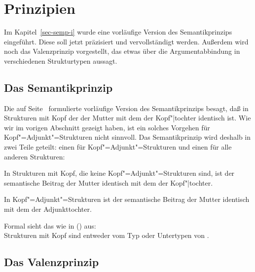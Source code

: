 \section{Prinzipien}
\label{sec-prinzipien}

Im Kapitel~\ref{sec-semp-i} wurde eine vorläufige Version des Semantikprinzips eingeführt. Diese
soll jetzt präzisiert und vervollständigt werden. Außerdem wird noch das Valenzprinzip vorgestellt, das etwas über
die Argumentabbindung in verschiedenen Strukturtypen aussagt.

\subsection{Das Semantikprinzip}

Die auf Seite~\pageref{semp-i} formulierte vorläufige Version des Semantikprinzips besagt,
daß in Strukturen mit Kopf der \contw der Mutter mit dem \contw der Kopf"|tochter
identisch ist. Wie wir im vorigen Abschnitt gezeigt haben, ist ein solches Vorgehen für
Kopf"=Adjunkt"=Strukturen nicht sinnvoll. Das Semantikprinzip wird deshalb in zwei Teile geteilt:
einen für Kopf"=Adjunkt"=Strukturen und einen für alle anderen Strukturen:
\begin{prinzip-break}[Semantikprinzip]
\label{semp}
In Strukturen mit Kopf, die keine Kopf"=Adjunkt"=Strukturen sind, ist der
semantische Beitrag der Mutter identisch mit dem der Kopf"|tochter.

In Kopf"=Adjunkt"=Strukturen ist der semantische Beitrag der Mutter
identisch mit dem der Adjunkttochter.
\end{prinzip-break}
Formal sieht das wie in () aus:
\ea
{} \impl
{}\\[2mm]

 \impl
{}
\z
Strukturen mit Kopf sind entweder vom Typ  oder Untertypen von
.


\subsection{Das Valenzprinzip}
\label{sec-valp}


